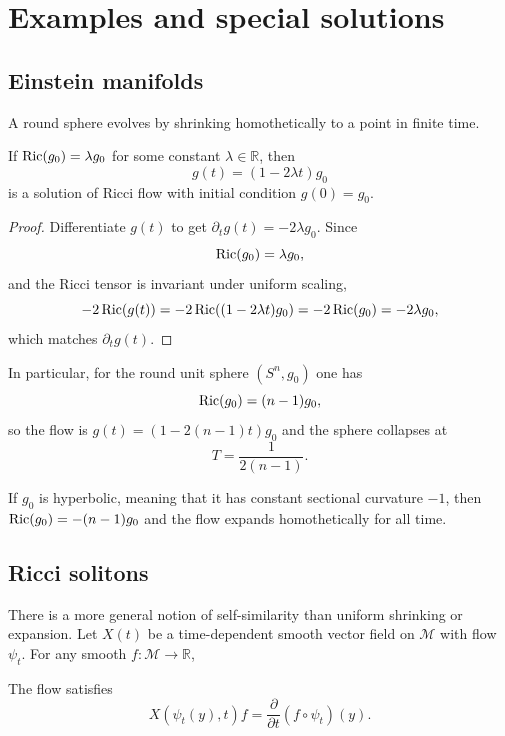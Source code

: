\section{Examples and special solutions}

\subsection{Einstein manifolds}

A round sphere evolves by shrinking homothetically to a point in finite time.

\begin{remark}
\label{topping-intro-einstein-flow}
If $\operatorname{Ric}(g_0)=\lambda g_0$ for some constant $\lambda\in\mathbb R$, then
\[
g(t)=(1-2\lambda t)g_0
\]
is a solution of Ricci flow with initial condition $g(0)=g_0$.
\end{remark}

\begin{proof}
Differentiate $g(t)$ to get $\partial_t g(t)=-2\lambda g_0$. Since
\[
\operatorname{Ric}(g_0)=\lambda g_0,
\]
and the Ricci tensor is invariant under uniform scaling,
\[
-2\operatorname{Ric}(g(t))=-2\operatorname{Ric}((1-2\lambda t)g_0)=-2\operatorname{Ric}(g_0)=-2\lambda g_0,
\]
which matches $\partial_t g(t)$.
\end{proof}

In particular, for the round unit sphere $(S^n,g_0)$ one has
\[
\operatorname{Ric}(g_0)=(n-1)g_0,
\]
so the flow is $g(t)=(1-2(n-1)t)g_0$ and the sphere collapses at
\[
T=\frac{1}{2(n-1)}.
\]

If $g_0$ is hyperbolic, meaning that it has constant sectional curvature $-1$,
then $\operatorname{Ric}(g_0)=-(n-1)g_0$ and the flow expands homothetically for all time.

\subsection{Ricci solitons}

There is a more general notion of self-similarity than uniform shrinking or
expansion. Let $X(t)$ be a time-dependent smooth vector field on $\mathcal M$
with flow $\psi_t$. For any smooth $f:\mathcal M\to\mathbb R$,
\begin{definition}
\label{topping-intro-flow-field}
The flow satisfies
\[
X(\psi_t(y),t)f = \frac{\partial}{\partial t}(f\circ\psi_t)(y).
\]
\end{definition}

